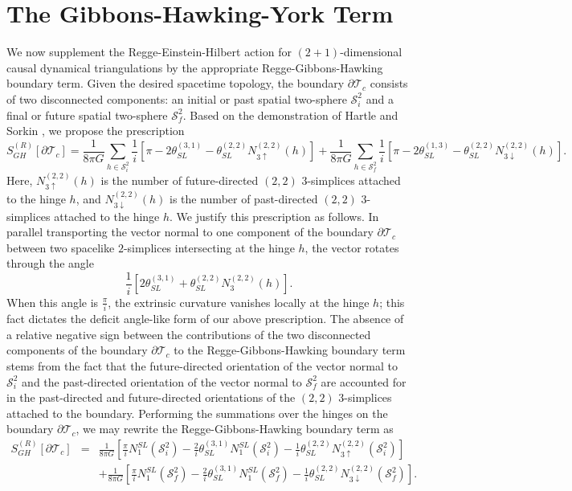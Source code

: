 \documentclass{article}
\begin{document}
\section{The Gibbons-Hawking-York Term}

We now supplement the Regge-Einstein-Hilbert action for
$(2+1)$-dimensional causal dynamical triangulations by the appropriate
Regge-Gibbons-Hawking boundary term. Given the desired spacetime
topology, the boundary $\partial\mathcal{T}_{c}$ consists of two
disconnected components: an initial or past spatial two-sphere
$\mathcal{S}_{i}^{2}$ and a final or future spatial two-sphere
$\mathcal{S}_{f}^{2}$. Based on the demonstration of Hartle and
Sorkin \cite{BoundaryTerm}, we propose the prescription
\begin{equation}
S_{GH}^{(R)}[\partial\mathcal{T}_{c}]=\frac{1}{8\pi G}\sum_{h\in\mathcal{S}_{i}^{2}}\frac{1}{i}\left[\pi-2\theta_{SL}^{(3,1)}-\theta_{SL}^{(2,2)}N_{3\uparrow}^{(2,2)}(h)\right]+\frac{1}{8\pi G}\sum_{h\in\mathcal{S}_{f}^{2}}\frac{1}{i}\left[\pi-2\theta_{SL}^{(1,3)}-\theta_{SL}^{(2,2)}N_{3\downarrow}^{(2,2)}(h)\right].
\end{equation}
Here, $N_{3\uparrow}^{(2,2)}(h)$ is the number of future-directed
$(2,2)$ $3$-simplices attached to the hinge $h$, and
$N_{3\downarrow}^{(2,2)}(h)$ is the number of past-directed $(2,2)$
$3$-simplices attached to the hinge $h$. We justify this prescription
as follows. In parallel transporting the vector normal to one
component of the boundary $\partial\mathcal{T}_{c}$ between two
spacelike $2$-simplices intersecting at the hinge $h$, the vector
rotates through the angle
\begin{equation}
\frac{1}{i}\left[2\theta_{SL}^{(3,1)}+\theta_{SL}^{(2,2)}N_{3}^{(2,2)}(h)\right].
\end{equation}
When this angle is $\frac{\pi}{i}$, the extrinsic curvature vanishes
locally at the hinge $h$; this fact dictates the deficit angle-like
form of our above prescription. The absence of a relative negative
sign between the contributions of the two disconnected components of
the boundary $\partial\mathcal{T}_{c}$ to the Regge-Gibbons-Hawking
boundary term stems from the fact that the future-directed orientation
of the vector normal to $\mathcal{S}_{i}^{2}$ and the past-directed
orientation of the vector normal to $\mathcal{S}_{f}^{2}$ are
accounted for in the past-directed and future-directed orientations of
the $(2,2)$ $3$-simplices attached to the boundary. Performing the
summations over the hinges on the boundary $\partial\mathcal{T}_{c}$,
we may rewrite the Regge-Gibbons-Hawking boundary term as
\begin{eqnarray}
S_{GH}^{(R)}[\partial\mathcal{T}_{c}]&=&\frac{1}{8\pi G}\left[\frac{\pi}{i} N_{1}^{SL}(\mathcal{S}_{i}^{2})-\frac{2}{i}\theta_{SL}^{(3,1)}N_{1}^{SL}(\mathcal{S}_{i}^{2})-\frac{1}{i}\theta_{SL}^{(2,2)}N_{3\uparrow}^{(2,2)}(\mathcal{S}_{i}^{2})\right]\nonumber\\ &&+\frac{1}{8\pi G}\left[\frac{\pi}{i} N_{1}^{SL}(\mathcal{S}_{f}^{2})-\frac{2}{i}\theta_{SL}^{(3,1)}N_{1}^{SL}(\mathcal{S}_{f}^{2})-\frac{1}{i}\theta_{SL}^{(2,2)}N_{3\downarrow}^{(2,2)}(\mathcal{S}_{f}^{2})\right].
\end{eqnarray}
\end{document}
